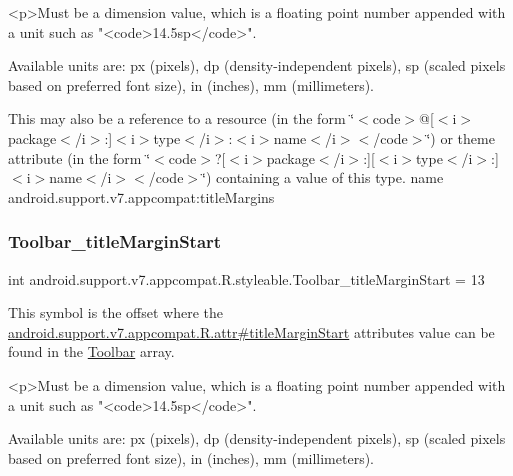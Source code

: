 \begin{DoxyVerb}      <p>Must be a dimension value, which is a floating point number appended with a unit such as "<code>14.5sp</code>".
\end{DoxyVerb}
 Available units are\+: px (pixels), dp (density-\/independent pixels), sp (scaled pixels based on preferred font size), in (inches), mm (millimeters). 

This may also be a reference to a resource (in the form \char`\"{}$<$code$>$@\mbox{[}$<$i$>$package$<$/i$>$\+:\mbox{]}$<$i$>$type$<$/i$>$\+:$<$i$>$name$<$/i$>$$<$/code$>$\char`\"{}) or theme attribute (in the form \char`\"{}$<$code$>$?\mbox{[}$<$i$>$package$<$/i$>$\+:\mbox{]}\mbox{[}$<$i$>$type$<$/i$>$\+:\mbox{]}$<$i$>$name$<$/i$>$$<$/code$>$\char`\"{}) containing a value of this type.  name android.\+support.\+v7.\+appcompat\+:title\+Margins \mbox{\label{classandroid_1_1support_1_1v7_1_1appcompat_1_1R_1_1styleable_aa1690beeeb06a36f3c4d56b00ea8777d}} 
\subsubsection{\texorpdfstring{Toolbar\+\_\+title\+Margin\+Start}{Toolbar\_titleMarginStart}}
{\footnotesize\ttfamily int android.\+support.\+v7.\+appcompat.\+R.\+styleable.\+Toolbar\+\_\+title\+Margin\+Start = 13\hspace{0.3cm}{\ttfamily [static]}}

This symbol is the offset where the \hyperlink{classandroid_1_1support_1_1v7_1_1appcompat_1_1R_1_1attr_adffd0131a9232a46d35e844631b0f817}{android.\+support.\+v7.\+appcompat.\+R.\+attr\#title\+Margin\+Start} attribute\textquotesingle{}s value can be found in the \hyperlink{classandroid_1_1support_1_1v7_1_1appcompat_1_1R_1_1styleable_a2daba9587ef9f700f2d54cf13435cb32}{Toolbar} array.

\begin{DoxyVerb}      <p>Must be a dimension value, which is a floating point number appended with a unit such as "<code>14.5sp</code>".
\end{DoxyVerb}
 Available units are\+: px (pixels), dp (density-\/independent pixels), sp (scaled pixels based on preferred font size), in (inches), mm (millimeters). 

